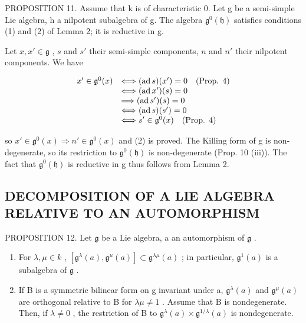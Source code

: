 PROPOSITION 11. Assume that k is of characteristic 0. Let g be a semi-simple Lie algebra, h a nilpotent subalgebra of g. The algebra \(\mathfrak{g}^{0}(\mathfrak{h})\) satisfies conditions (1) and (2) of Lemma 2; it is reductive in g.

Let \(x, x' \in \mathfrak{g}\) , \(s\) and \(s'\) their semi-simple components, \(n\) and \(n'\) their nilpotent components. We have

\[
\begin{array}{r l} x ^ {\prime} \in \mathfrak {g} ^ {0} (x) & \Longleftrightarrow (\operatorname{ad} s) (x ^ {\prime}) = 0 \quad \text {(Prop. 4)} \\ & \Longleftrightarrow (\operatorname{ad} x ^ {\prime}) (s) = 0 \\ & \Longrightarrow (\operatorname{ad} s ^ {\prime}) (s) = 0 \\ & \Longleftrightarrow (\operatorname{ad} s) (s ^ {\prime}) = 0 \\ & \Longleftrightarrow s ^ {\prime} \in \mathfrak {g} ^ {0} (x) \quad \text {(Prop. 4)} \end{array}
\]

so \(x' \in \mathfrak{g}^{0}(x) \Rightarrow n' \in \mathfrak{g}^{0}(x)\) and (2) is proved. The Killing form of g is non-degenerate, so its restriction to \(\mathfrak{g}^{0}(\mathfrak{h})\) is non-degenerate (Prop. 10 (iii)). The fact that \(\mathfrak{g}^{0}(\mathfrak{h})\) is reductive in g thus follows from Lemma 2.

\subsection{DECOMPOSITION OF A LIE ALGEBRA RELATIVE TO AN AUTOMORPHISM}

PROPOSITION 12. Let \(\mathfrak{g}\) be a Lie algebra, a an automorphism of \(\mathfrak{g}\) .

\begin{enumerate}
\def\labelenumi{(\roman{enumi})}
\item
  For \(\lambda, \mu \in k\) , \([\mathfrak{g}^{\lambda}(a), \mathfrak{g}^{\mu}(a)] \subset \mathfrak{g}^{\lambda \mu}(a)\) ; in particular, \(\mathfrak{g}^1(a)\) is a subalgebra of \(\mathfrak{g}\) .
\item
  If B is a symmetric bilinear form on g invariant under a, \(\mathfrak{g}^{\lambda}(a)\) and \(\mathfrak{g}^{\mu}(a)\) are orthogonal relative to B for \(\lambda\mu \neq 1\) . Assume that B is nondegenerate. Then, if \(\lambda \neq 0\) , the restriction of B to \(\mathfrak{g}^{\lambda}(a) \times \mathfrak{g}^{1/\lambda}(a)\) is nondegenerate.
\end{enumerate}

